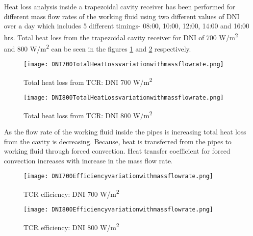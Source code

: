 Heat loss analysis inside a trapezoidal cavity receiver has been performed for different mass flow rates of the working fluid using two different values of DNI over a day which includes 5 different timings- 08:00, 10:00, 12:00, 14:00 and 16:00 hrs. Total heat loss from the trapezoidal cavity receiver for DNI of 700 W/m\textsuperscript{2} and 800 W/m\textsuperscript{2} can be seen in the figures \ref{fig:TotalHeatLossDNI700} and \ref{fig:TotalHeatLossDNI800} respectively. 

\begin{figure}[H]
\begin{center}
\texttt{[image: DNI700TotalHeatLossvariationwithmassflowrate.png]}
\caption{Total heat loss from TCR: DNI 700 W/m\textsuperscript{2}}
\label{fig:TotalHeatLossDNI700}
\end{center}
\end{figure}


\begin{figure}[H]
\begin{center}
\texttt{[image: DNI800TotalHeatLossvariationwithmassflowrate.png]}
\caption{Total heat loss from TCR: DNI 800 W/m\textsuperscript{2}}
\label{fig:TotalHeatLossDNI800}
\end{center}
\end{figure}


As the flow rate of the working fluid inside the pipes is increasing total heat loss from the cavity is decreasing. Because, heat is transferred from the pipes to working fluid through forced convection. Heat transfer coefficient for forced convection increases with increase in the mass flow rate. 

\begin{figure}[H]
\begin{center}
\texttt{[image: DNI700Efficiencyvariationwithmassflowrate.png]}
\caption{TCR efficiency: DNI 700 W/m\textsuperscript{2}}
\label{fig:EffDNI700}
\end{center}
\end{figure}


\begin{figure}[H]
\begin{center}
\texttt{[image: DNI800Efficiencyvariationwithmassflowrate.png]}
\caption{TCR efficiency: DNI 800 W/m\textsuperscript{2}}
\label{fig:EffDNI800}
\end{center}
\end{figure}

